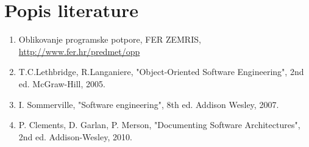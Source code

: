 \chapter*{Popis literature}


		\begin{enumerate}
			\item  Oblikovanje programske potpore, FER ZEMRIS, \url{http://www.fer.hr/predmet/opp}
			
			\item  T.C.Lethbridge, R.Langaniere, "Object-Oriented Software Engineering", 2nd ed. McGraw-Hill, 2005.
			
			\item  I. Sommerville, "Software engineering", 8th ed. Addison Wesley, 2007.
			
			\item P. Clements, D. Garlan, P. Merson, "Documenting Software Architectures", 2nd ed. Addison-Wesley, 2010.
			
			
		\end{enumerate}